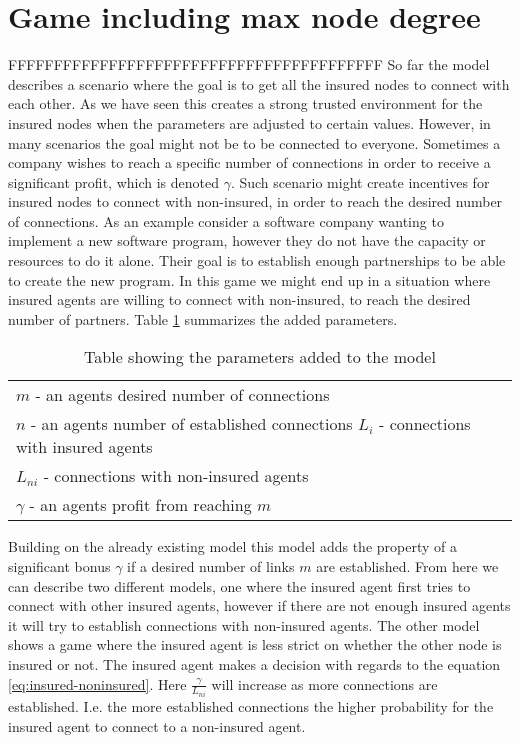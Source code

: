 
\section{Game including max node degree}

FFFFFFFFFFFFFFFFFFFFFFFFFFFFFFFFFFFFFFFFF
So far the model describes a scenario where the goal is to get all the insured nodes to connect with each other. As we have seen this creates a strong trusted environment for the insured nodes when the parameters are adjusted to certain values. However, in many scenarios the goal might not be to be connected to everyone. Sometimes a company wishes to reach a specific number of connections in order to receive a significant profit, which is denoted $\gamma$. Such scenario might create incentives for insured nodes to connect with non-insured, in order to reach the desired number of connections. As an example consider a software company wanting to implement a new software program, however they do not have the capacity or resources to do it alone. Their goal is to establish enough partnerships to be able to create the new program. In this game we might end up in a situation where insured agents are willing to connect with non-insured, to reach the desired number of partners. Table \ref{tbl:model3para} summarizes the added parameters. 

\begin{table}[h]
\centering
\begin{tabular}{lc}
 \hline
  $m$ - an agents desired number of connections\\
  $n$ - an agents number of established connections
  $L_{i}$ - connections with insured agents \\
  $L_{ni}$ - connections with non-insured agents\\
  $\gamma$ - an agents profit from reaching $m$ \\
  \hline
\end{tabular}
\caption{Table showing the parameters added to the model \label{tbl:model3para}}
\end{table}


Building on the already existing model this model adds the property of a significant bonus $\gamma$ if a desired number of links $m$ are established. From here we can describe two different models, one where the insured agent first tries to connect with other insured agents, however if there are not enough insured agents it will try to establish connections with non-insured agents. The other model shows a game where the insured agent is less strict on whether the other node is insured or not. The insured agent makes a decision with regards to the equation \ref{eq:insured-noninsured}. Here $\frac{\gamma}{ L_{ni}}$ will increase as more connections are established. I.e. the more established connections the higher probability for the insured agent to connect to a non-insured agent.


